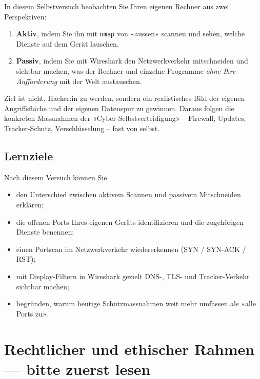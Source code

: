 \documentclass[
  nswissgerman,
  a4paper,
  DIV=11,
  numbers=noendperiod,
  ngerman]{scrreprt}
\providecommand{\tightlist}{%
  \setlength{\itemsep}{0pt}\setlength{\parskip}{0pt}}
\begin{document}
In diesem Selbstversuch beobachten Sie Ihren eigenen Rechner aus zwei
Perspektiven:

\begin{enumerate}
\def\labelenumi{\arabic{enumi}.}
\tightlist
\item
  \textbf{Aktiv}, indem Sie ihn mit \texttt{nmap} von «aussen» scannen
  und sehen, welche Dienste auf dem Gerät lauschen.
\item
  \textbf{Passiv}, indem Sie mit Wireshark den Netzwerkverkehr
  mitschneiden und sichtbar machen, was der Rechner und einzelne
  Programme \emph{ohne Ihre Aufforderung} mit der Welt austauschen.
\end{enumerate}

Ziel ist nicht, Hacker:in zu werden, sondern ein realistisches Bild der
eigenen Angriffsfläche und der eigenen Datenspur zu gewinnen. Daraus
folgen die konkreten Massnahmen der «Cyber-Selbstverteidigung» --
Firewall, Updates, Tracker-Schutz, Verschlüsselung -- fast von selbst.

\subsection{Lernziele}\label{lernziele}

Nach diesem Versuch können Sie

\begin{itemize}
\tightlist
\item
  den Unterschied zwischen aktivem Scannen und passivem Mitschneiden
  erklären;
\item
  die offenen Ports Ihres eigenen Geräts identifizieren und die
  zugehörigen Dienste benennen;
\item
  einen Portscan im Netzwerkverkehr wiedererkennen (SYN / SYN-ACK /
  RST);
\item
  mit Display-Filtern in Wireshark gezielt DNS-, TLS- und
  Tracker-Verkehr sichtbar machen;
\item
  begründen, warum heutige Schutzmassnahmen weit mehr umfassen als «alle
  Ports zu».
\end{itemize}

\section{\texorpdfstring{Rechtlicher und ethischer Rahmen ---
\textbf{bitte zuerst
lesen}}{Rechtlicher und ethischer Rahmen --- bitte zuerst lesen}}\label{rechtlicher-und-ethischer-rahmen-bitte-zuerst-lesen}
\end{document}
